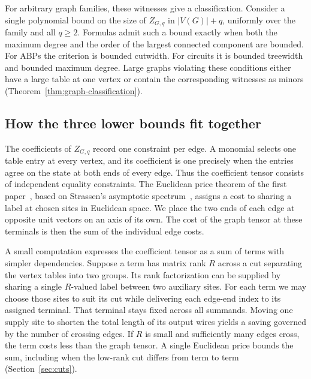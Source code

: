 For arbitrary graph families, these witnesses give a classification.
Consider a single polynomial bound on the size of \(Z_{G,q}\) in
\(|V(G)|+q\), uniformly over the family and all \(q\ge2\).
Formulas admit such a bound exactly when both the maximum degree and
the order of the largest connected component are bounded. For ABPs the
criterion is bounded cutwidth. For circuits it is bounded treewidth
and bounded maximum degree. Large graphs violating these conditions
either have a large table at one vertex or contain the corresponding
witnesses as minors (Theorem~\ref{thm:graph-classification}).

\subsection*{How the three lower bounds fit together}

The coefficients of \(Z_{G,q}\) record one constraint per edge. A
monomial selects one table entry at every vertex, and its coefficient
is one precisely when the entries agree on the state at both ends of
every edge. Thus the coefficient tensor consists of independent
equality constraints. The Euclidean price theorem of the first
paper~\cite{oaG}, based on Strassen's asymptotic spectrum~\cite{Strassen},
assigns a cost to sharing a label at chosen sites in Euclidean space.
We place the two ends of each edge at opposite unit vectors on an axis
of its own. The cost of
the graph tensor at these terminals is then the sum of the individual
edge costs.

A small computation expresses the coefficient tensor as a sum of terms
with simpler dependencies. Suppose a term has matrix rank \(R\) across
a cut separating the vertex tables into two groups. Its rank
factorization can be supplied by sharing a single \(R\)-valued label
between two auxiliary sites. For each term we may choose those sites
to suit its cut while delivering each edge-end index to its assigned
terminal. That terminal stays fixed across all summands. Moving one
supply site to shorten the total length of its output wires yields a
saving governed by the number of crossing edges. If \(R\)
is small and sufficiently many edges cross, the term costs less than
the graph tensor. A single Euclidean price bounds the sum, including
when the low-rank cut differs from term to term
(Section~\ref{sec:cuts}).



